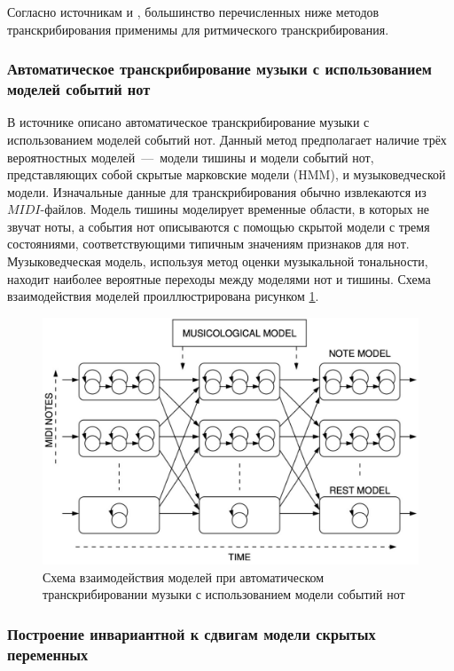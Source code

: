 Согласно источникам \cite{bib9} и \cite{bib10}, большинство перечисленных ниже методов транскрибирования применимы для ритмического транскрибирования.

\subsubsection{Автоматическое транскрибирование музыки с использованием моделей событий нот}

В источнике \cite{bib4} описано автоматическое транскрибирование музыки с использованием моделей событий нот. Данный метод предполагает наличие трёх вероятностных моделей~---~модели тишины и модели событий нот, представляющих собой скрытые марковские модели (HMM), и музыковедческой модели. Изначальные данные для транскрибирования обычно извлекаются из $MIDI$-файлов. Модель тишины моделирует временные области, в которых не звучат ноты, а события нот описываются с помощью скрытой модели с тремя состояниями, соответствующими типичным значениям признаков для нот. Музыковедческая модель, используя метод оценки музыкальной тональности, находит наиболее вероятные переходы между моделями нот и тишины. Схема взаимодействия моделей проиллюстрирована рисунком \ref{img:hmm}. 

\begin{figure}[h!]
    \centering
    \includegraphics[scale=0.5]{img/hmm.pdf}
    \caption{Схема взаимодействия моделей при автоматическом транскрибировании музыки с использованием модели событий нот \cite{bib4}}
    \label{img:hmm}
\end{figure}

\subsubsection{Построение инвариантной к сдвигам модели скрытых переменных}

